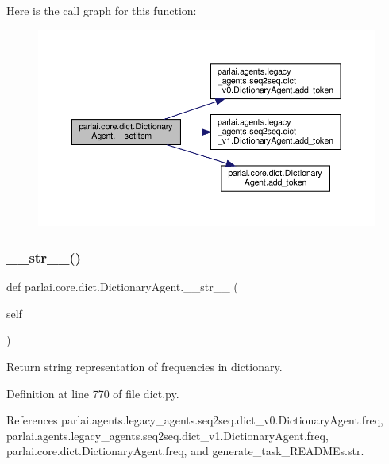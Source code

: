 Here is the call graph for this function\+:
\nopagebreak
\begin{figure}[H]
\begin{center}
\leavevmode
\includegraphics[width=350pt]{classparlai_1_1core_1_1dict_1_1DictionaryAgent_a43dfd6220ded966731b62bca37333dec_cgraph}
\end{center}
\end{figure}
\mbox{\label{classparlai_1_1core_1_1dict_1_1DictionaryAgent_a4b822841903bedb2b0f866e7bd17f3fa}} 
\subsubsection{\texorpdfstring{\+\_\+\+\_\+str\+\_\+\+\_\+()}{\_\_str\_\_()}}
{\footnotesize\ttfamily def parlai.\+core.\+dict.\+Dictionary\+Agent.\+\_\+\+\_\+str\+\_\+\+\_\+ (\begin{DoxyParamCaption}\item[{}]{self }\end{DoxyParamCaption})}

\begin{DoxyVerb}Return string representation of frequencies in dictionary.\end{DoxyVerb}
 

Definition at line 770 of file dict.\+py.



References parlai.\+agents.\+legacy\+\_\+agents.\+seq2seq.\+dict\+\_\+v0.\+Dictionary\+Agent.\+freq, parlai.\+agents.\+legacy\+\_\+agents.\+seq2seq.\+dict\+\_\+v1.\+Dictionary\+Agent.\+freq, parlai.\+core.\+dict.\+Dictionary\+Agent.\+freq, and generate\+\_\+task\+\_\+\+R\+E\+A\+D\+M\+Es.\+str.

